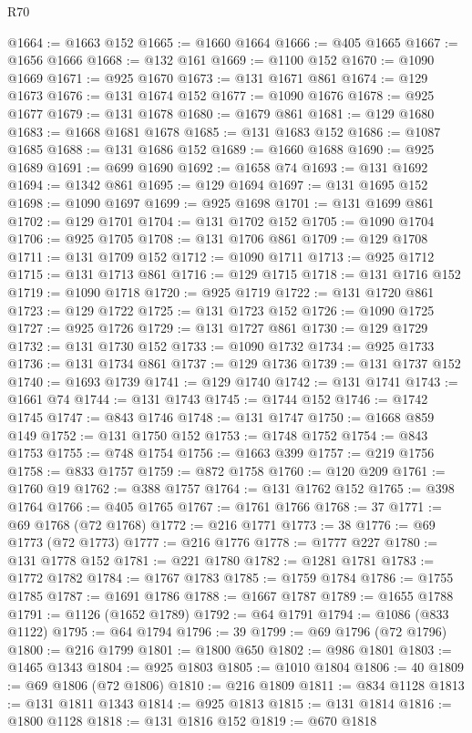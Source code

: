 \begin{lexlean}{R70}
\begin{coremodule}
@1664 := @1663 @152
@1665 := @1660 @1664
@1666 := @405 @1665
@1667 := @1656 @1666
@1668 := @132 @161
@1669 := @1100 @152
@1670 := @1090 @1669
@1671 := @925 @1670
@1673 := @131 @1671 @861
@1674 := @129 @1673
@1676 := @131 @1674 @152
@1677 := @1090 @1676
@1678 := @925 @1677
@1679 := @131 @1678
@1680 := @1679 @861
@1681 := @129 @1680
@1683 := @1668 @1681 @1678
@1685 := @131 @1683 @152
@1686 := @1087 @1685
@1688 := @131 @1686 @152
@1689 := @1660 @1688
@1690 := @925 @1689
@1691 := @699 @1690
@1692 := @1658 @74
@1693 := @131 @1692
@1694 := @1342 @861
@1695 := @129 @1694
@1697 := @131 @1695 @152
@1698 := @1090 @1697
@1699 := @925 @1698
@1701 := @131 @1699 @861
@1702 := @129 @1701
@1704 := @131 @1702 @152
@1705 := @1090 @1704
@1706 := @925 @1705
@1708 := @131 @1706 @861
@1709 := @129 @1708
@1711 := @131 @1709 @152
@1712 := @1090 @1711
@1713 := @925 @1712
@1715 := @131 @1713 @861
@1716 := @129 @1715
@1718 := @131 @1716 @152
@1719 := @1090 @1718
@1720 := @925 @1719
@1722 := @131 @1720 @861
@1723 := @129 @1722
@1725 := @131 @1723 @152
@1726 := @1090 @1725
@1727 := @925 @1726
@1729 := @131 @1727 @861
@1730 := @129 @1729
@1732 := @131 @1730 @152
@1733 := @1090 @1732
@1734 := @925 @1733
@1736 := @131 @1734 @861
@1737 := @129 @1736
@1739 := @131 @1737 @152
@1740 := @1693 @1739
@1741 := @129 @1740
@1742 := @131 @1741
@1743 := @1661 @74
@1744 := @131 @1743
@1745 := @1744 @152
@1746 := @1742 @1745
@1747 := @843 @1746
@1748 := @131 @1747
@1750 := @1668 @859 @149
@1752 := @131 @1750 @152
@1753 := @1748 @1752
@1754 := @843 @1753
@1755 := @748 @1754
@1756 := @1663 @399
@1757 := @219 @1756
@1758 := @833 @1757
@1759 := @872 @1758
@1760 := @120 @209
@1761 := @1760 @19
@1762 := @388 @1757
@1764 := @131 @1762 @152
@1765 := @398 @1764
@1766 := @405 @1765
@1767 := @1761 @1766
@1768 := 37
@1771 := @69 @1768 (@72 @1768)
@1772 := @216 @1771
@1773 := 38
@1776 := @69 @1773 (@72 @1773)
@1777 := @216 @1776
@1778 := @1777 @227
@1780 := @131 @1778 @152
@1781 := @221 @1780
@1782 := @1281 @1781
@1783 := @1772 @1782
@1784 := @1767 @1783
@1785 := @1759 @1784
@1786 := @1755 @1785
@1787 := @1691 @1786
@1788 := @1667 @1787
@1789 := @1655 @1788
@1791 := @1126 (@1652 @1789)
@1792 := @64 @1791
@1794 := @1086 (@833 @1122)
@1795 := @64 @1794
@1796 := 39
@1799 := @69 @1796 (@72 @1796)
@1800 := @216 @1799
@1801 := @1800 @650
@1802 := @986 @1801
@1803 := @1465 @1343
@1804 := @925 @1803
@1805 := @1010 @1804
@1806 := 40
@1809 := @69 @1806 (@72 @1806)
@1810 := @216 @1809
@1811 := @834 @1128
@1813 := @131 @1811 @1343
@1814 := @925 @1813
@1815 := @131 @1814
@1816 := @1800 @1128
@1818 := @131 @1816 @152
@1819 := @670 @1818

\end{coremodule}
\end{lexlean}
